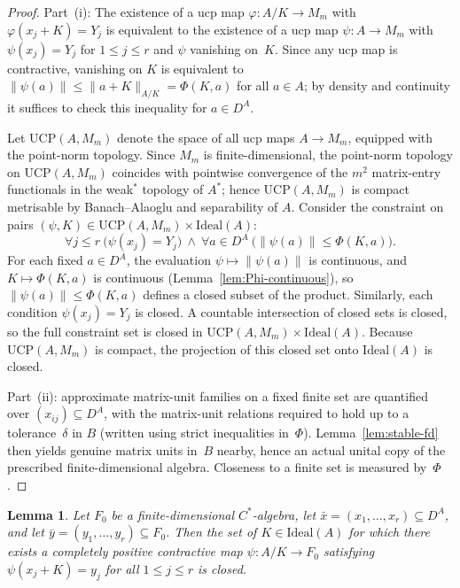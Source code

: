 \documentclass[12pt,fleqn,a4paper]{amsart}
\renewcommand{\le}{\leqslant}
\numberwithin{equation}{section}
\newtheorem{lemma}[theorem]{Lemma}
\theoremstyle{definition}
\newcommand{\Ideal}{\mathrm{Ideal}}
\begin{document}
\begin{proof}
Part~(i): The existence of a ucp map $\varphi:A/K\to M_m$ with
$\varphi(x_j+K)=Y_j$ is equivalent to the existence of a ucp map
$\psi:A\to M_m$ with $\psi(x_j)=Y_j$ for $1\le j\le r$ and $\psi$ vanishing on~$K$.
Since any ucp map is contractive, vanishing on $K$ is equivalent to
$\|\psi(a)\| \le \|a+K\|_{A/K} = \Phi(K,a)$ for all $a\in A$; by density
and continuity it suffices to check this inequality for $a\in D^A$.

Let $\mathrm{UCP}(A,M_m)$ denote the space of all ucp maps $A\to M_m$, equipped
with the point-norm topology.
Since $M_m$ is finite-dimensional, the point-norm topology on $\mathrm{UCP}(A,M_m)$
coincides with pointwise convergence of the $m^2$ matrix-entry functionals in the
weak$^*$ topology of $A^*$; hence $\mathrm{UCP}(A,M_m)$ is compact metrisable by
Banach--Alaoglu and separability of $A$.
Consider the constraint on pairs
$(\psi, K) \in \mathrm{UCP}(A,M_m) \times \Ideal(A)$:
\[
\forall j\le r\ \bigl(\psi(x_j)=Y_j\bigr) \ \wedge \ 
\forall a\in D^A\ \bigl(\|\psi(a)\| \le \Phi(K,a)\bigr).
\]
For each fixed $a\in D^A$, the evaluation $\psi \mapsto \|\psi(a)\|$ is continuous,
and $K \mapsto \Phi(K,a)$ is continuous (Lemma~\ref{lem:Phi-continuous}), so
$\|\psi(a)\|\le\Phi(K,a)$ defines a closed subset of the product.
Similarly, each condition $\psi(x_j)=Y_j$ is closed.
A countable intersection of closed sets is closed, so the full constraint set
is closed in $\mathrm{UCP}(A,M_m) \times \Ideal(A)$.
Because $\mathrm{UCP}(A,M_m)$ is compact, the projection of this closed set onto
$\Ideal(A)$ is closed.

Part~(ii): approximate
matrix-unit families on a fixed finite set are quantified over
$(x_{ij})\subseteq D^A$, with the matrix-unit relations required to hold up to a
tolerance~$\delta$ in $B$ (written using strict inequalities in~$\Phi$).
Lemma~\ref{lem:stable-fd} then yields genuine matrix units in~$B$
nearby, hence an actual unital copy of the prescribed finite-dimensional algebra.
Closeness to a finite set is measured by~$\Phi$.
\end{proof}

\begin{lemma}\label{lem:cpc-fd}
Let $F_0$ be a finite-dimensional $C^*$-algebra, let
$\bar x=(x_1,\dots,x_r)\subseteq D^A$, and let $\bar y=(y_1,\dots,y_r)\subseteq F_0$.
Then the set of $K\in\Ideal(A)$ for which there exists a completely positive
contractive map
$\psi:A/K\to F_0$
satisfying $\psi(x_j+K)=y_j$ for all $1\le j\le r$ is closed.
\end{lemma}
\end{document}
